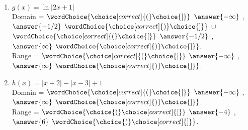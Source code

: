\documentclass{ximera}
\begin{document}
\begin{exercise}
\begin{enumerate}
\item $g(x) =  \ln|2x+1|$ \\
Domain = $\wordChoice{\choice[correct]{(}\choice{[}}$ 
$\answer{-\infty}$ , $\answer{-1/2}$ 
$\wordChoice{\choice[correct]{)}\choice{]}}$ 
$\cup$  
$\wordChoice{\choice[correct]{(}\choice{[}}$ 
$\answer{-1/2}$ , $\answer{\infty}$ 
$\wordChoice{\choice[correct]{)}\choice{]}}$.\\
Range = $\wordChoice{\choice[correct]{(}\choice{[}}$ 
$\answer{-\infty}$ , $\answer{\infty}$ 
$\wordChoice{\choice[correct]{)}\choice{]}}$.


\item $h(x) =  |x+2|-|x-3|+1$ \\
Domain = $\wordChoice{\choice[correct]{(}\choice{[}}$ 
$\answer{-\infty}$ , $\answer{\infty}$ 
$\wordChoice{\choice[correct]{)}\choice{]}}$.\\
Range = $\wordChoice{\choice{(}\choice[correct]{[}}$ $\answer{-4}$ , $\answer{6}$ $\wordChoice{\choice{)}\choice[correct]{]}}$.
\end{enumerate}

\end{exercise}
\end{document}
